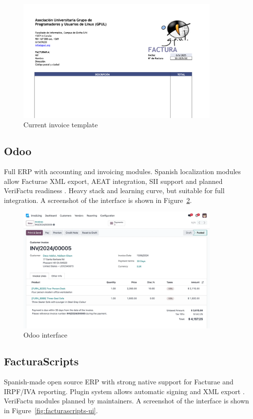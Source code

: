 \begin{figure}[H]
  \centering
  \includegraphics[width=0.9\textwidth]{imaxes/invoice.png}
  \caption{Current invoice template}
  \label{fig:invoice}
\end{figure}

\subsection*{Odoo}
Full ERP with accounting and invoicing modules. Spanish localization modules allow Facturae XML export, AEAT integration, SII support and planned VeriFactu readiness \cite{odoo-einvoice-spain}. Heavy stack and learning curve, but suitable for full integration. A screenshot of the interface is shown in Figure~\ref{fig:odoo-ui}.

\begin{figure}[H]
  \centering
  \includegraphics[width=0.9\textwidth]{imaxes/odoo-ui.png}
  \caption{Odoo interface}
  \label{fig:odoo-ui}
\end{figure}

\subsection*{FacturaScripts}
Spanish-made open source ERP with strong native support for Facturae and IRPF/IVA reporting. Plugin system allows automatic signing and XML export \cite{facturascripts-antifraude}. VeriFactu modules planned by maintainers. A screenshot of the interface is shown in Figure~\ref{fig:facturascripts-ui}.

